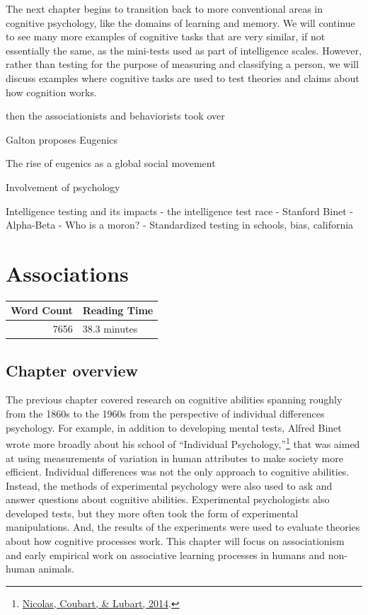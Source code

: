 \documentclass[
  oneside,
  12pt]{crumpbook}
\begin{document}
The next chapter begins to transition back to more conventional areas in cognitive psychology, like the domains of learning and memory. We will continue to see many more examples of cognitive tasks that are very similar, if not essentially the same, as the mini-tests used as part of intelligence scales. However, rather than testing for the purpose of measuring and classifying a person, we will discuss examples where cognitive tasks are used to test theories and claims about how cognition works.

then the associationists and behaviorists took over

Galton proposes Eugenics

The rise of eugenics as a global social movement

Involvement of psychology

Intelligence testing and its impacts
- the intelligence test race
- Stanford Binet
- Alpha-Beta
- Who is a moron?
- Standardized testing in schools, bias, california

\hypertarget{associations}{%
\chapter{Associations}\label{associations}}

\begin{tabular}{r|l}
\hline
Word Count & Reading Time\\
\hline
7656 & 38.3 minutes\\
\hline
\end{tabular}

\hypertarget{chapter-overview-4}{%
\section{Chapter overview}\label{chapter-overview-4}}

The previous chapter covered research on cognitive abilities spanning roughly from the 1860s to the 1960s from the perspective of individual differences psychology. For example, in addition to developing mental tests, Alfred Binet wrote more broadly about his school of ``Individual Psychology,''\footnote{\protect\hyperlink{ref-nicolasProgramIndividualPsychology2014}{Nicolas, Coubart, \& Lubart, 2014}.} that was aimed at using measurements of variation in human attributes to make society more efficient. Individual differences was not the only approach to cognitive abilities. Instead, the methods of experimental psychology were also used to ask and answer questions about cognitive abilities. Experimental psychologists also developed tests, but they more often took the form of experimental manipulations. And, the results of the experiments were used to evaluate theories about how cognitive processes work. This chapter will focus on associationism and early empirical work on associative learning processes in humans and non-human animals.
\end{document}
